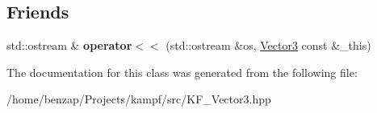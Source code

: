 \subsection*{Friends}
\begin{DoxyCompactItemize}
\item 
\hypertarget{classVector3_a3cfbfe062a33623df86c646442275cf6}{std\-::ostream \& {\bfseries operator$<$$<$} (std\-::ostream \&os, \hyperlink{classVector3}{Vector3} const \&\-\_\-this)}\label{classVector3_a3cfbfe062a33623df86c646442275cf6}

\end{DoxyCompactItemize}


The documentation for this class was generated from the following file\-:\begin{DoxyCompactItemize}
\item 
/home/benzap/\-Projects/kampf/src/K\-F\-\_\-\-Vector3.\-hpp\end{DoxyCompactItemize}
